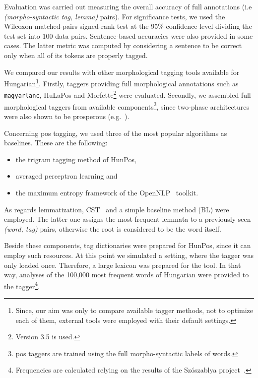 Evaluation was carried out measuring the overall accuracy of full annotations (i.e \emph{(morpho-syntactic tag, lemma)} pairs). 
For significance tests, we used the Wilcoxon matched-pairs signed-rank test at the 95\% confidence level dividing the test set into 100 data pairs.
Sentence-based accuracies were also provided in some cases. 
The latter metric was computed by considering a sentence to be correct only when all of its tokens are properly tagged. 

We compared our results with other morphological tagging tools available for Hungarian\footnote{Since, our aim was only to compare available tagger methods, not to optimize each of them, external tools were employed with their default settings.}. 
Firstly, taggers providing full morphological annotations such as \texttt{magyarlanc}, HuLaPos and Morfette\footnote{Version 3.5 is used.} were evaluated.  
Secondly, we assembled full morphological taggers from available components\footnote{\acrshort{pos} taggers are trained using the full morpho-syntactic labels of words.}, since two-phase architectures were also shown to be prosperous (e.g.~\cite{Agic2013,Erjavec2004}). 

Concerning \gls{pos} tagging, we used three of the most popular algorithms as baselines. These are the following:
\begin{itemize}
  \item the trigram tagging method of HunPos,
  \item averaged perceptron learning and
  \item the maximum entropy framework of the OpenNLP~\cite{Baldridge2002} toolkit.
\end{itemize}

As regards lemmatization, CST~\cite{Jongejan} and a simple baseline method (BL) were employed. 
The latter one assigns the most frequent lemmata to a previously seen \emph{(word, tag)} pairs, otherwise the root is considered to be the word itself.

Beside these components, tag dictionaries were prepared for HunPos, since it can employ such resources.  
At this point we simulated a setting, where the tagger was only loaded once.
Therefore, a large lexicon was prepared for the tool.
In that way, analyses of the 100,000 most frequent words of Hungarian were provided to the tagger\footnote{Frequencies are calculated relying on the results of the Szószablya project~\cite{Halacsy2004}.}.



